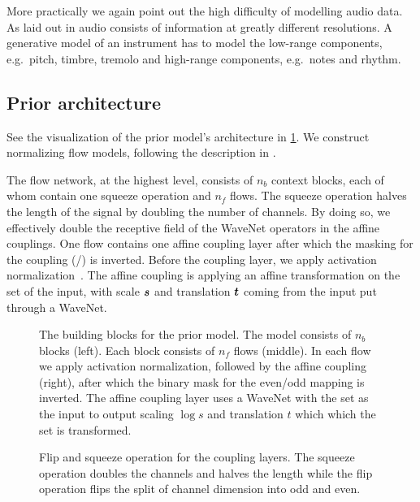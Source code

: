 More practically we again point out the high difficulty of modelling audio data. As laid out in  audio consists of information at greatly different resolutions. A generative model of an instrument has to model the low-range components, e.g.\ pitch, timbre, tremolo and high-range components, e.g.\ notes and rhythm.

\subsection{Prior architecture}

See the visualization of the prior model's architecture in \cref{fig:prior_network}. We construct normalizing flow models, following the description in \textcite{kimFloWaveNet2019}.

The flow network, at the highest level, consists of \(n_b\) context blocks, each of whom contain one squeeze operation and \(n_f\) flows. The squeeze operation halves the length of the signal by doubling the number of channels. By doing so, we effectively double the receptive field of the WaveNet operators in the affine couplings. One flow contains one affine coupling layer after which the masking for the coupling (/) is inverted. Before the coupling layer, we apply activation normalization~\cite{kingmaGlow2018}. The affine coupling is applying an affine transformation on the  set of the input, with scale \(\s\) and translation \(\B{t}\) coming from the  input put through a  WaveNet.

\begin{figure}[t]
    
    \caption{The building blocks for the prior model. The model consists of \(n_b\) blocks (left). Each block consists of \(n_f\) flows (middle). In each flow we apply activation normalization, followed by the affine coupling (right), after which the binary mask for the even/odd mapping is inverted. The affine coupling layer uses a WaveNet with the  set as the input to output scaling \(\log s\) and translation \(t\) which which the  set is transformed.}%
    \label{fig:prior_network}
\end{figure}

\begin{figure}
    \centering
    \caption{Flip and squeeze operation for the coupling layers. The squeeze operation doubles the channels and halves the length while the flip operation flips the split of channel dimension into {\color{orange!70}odd} and {\color{blue!70}even}.}%
    \label{fig:squeeze}%
\end{figure}

